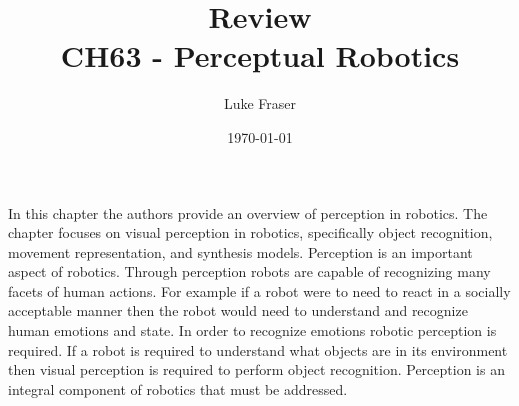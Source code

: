 \documentclass{article}
\begin{document}
\title{{\large Review} \\ CH63 - Perceptual Robotics}
\author{Luke Fraser}
\date{\today}
\maketitle

\begingroup
\renewcommand{\section}[2]{}


\endgroup

\section*{Summary}
In this chapter the authors provide an overview of perception in robotics. The chapter focuses on visual perception in robotics, specifically object recognition, movement representation, and synthesis models. Perception is an important aspect of robotics. Through perception robots are capable of recognizing many facets of human actions. For example if a robot were to need to react in a socially acceptable manner then the robot would need to understand and recognize human emotions and state. In order to recognize emotions robotic perception is required. If a robot is required to understand what objects are in its environment then visual perception is required to perform object recognition. Perception is an integral component of robotics that must be addressed.


\section*{Strengths}

\section*{Critique}

\cite{chapter}
\end{document}
